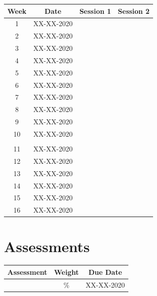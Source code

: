 \documentclass{article}
\begin{document}
\renewcommand{\arraystretch}{1.5}
\begin{tabular}{|c|c|c|c|}
  \hline
  \textbf{Week} & \textbf{Date} & \textbf{Session 1} & \textbf{Session 2} \\ \hline
  1             & XX-XX-2020    &                   &                   \\ \hline
  2             & XX-XX-2020    &                    &                    \\ \hline
  3             & XX-XX-2020    &                    &                    \\ \hline
  4             & XX-XX-2020    &                    &                    \\ \hline
  5             & XX-XX-2020    &                    &                    \\ \hline
  6             & XX-XX-2020    &                    &                    \\ \hline
  7             & XX-XX-2020    &                    &                     \\ \hline
  8             & XX-XX-2020    &                    &                    \\ \hline
  9             & XX-XX-2020    &                    &                    \\ \hline
  10            & XX-XX-2020    &                    &                    \\ \hline
  \rowcolor{yellow} \multicolumn{4}{|c|}{Mid Term Break}                                                      \\ \hline
  11            & XX-XX-2020    &                      &                      \\ \hline
  12            & XX-XX-2020    &                    &                    \\ \hline
  13            & XX-XX-2020    &                    &                    \\ \hline
  14            & XX-XX-2020    &                    &                    \\ \hline
  15            & XX-XX-2020    &                    &                    \\ \hline
  16            & XX-XX-2020    &                     &                      \\ \hline
\end{tabular}

\section*{Assessments}
\renewcommand{\arraystretch}{1.5}
\begin{tabular}{|c|c|c|}
  \hline
  \textbf{Assessment} & \textbf{Weight} & \textbf{Due Date} \\ \hline
            & \%            & XX-XX-2020        \\ \hline
\end{tabular}
\end{document}
